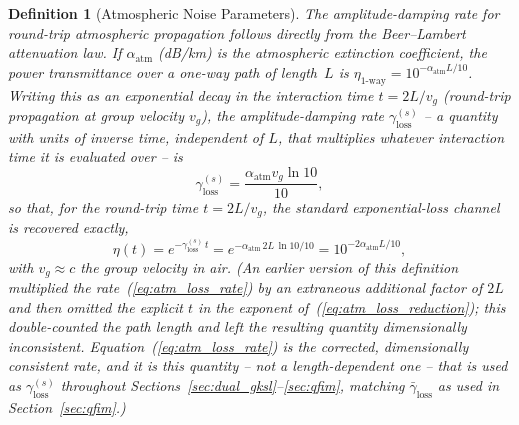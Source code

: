 \documentclass[journal]{IEEEtran}
\newtheorem{definition}{Definition}
\begin{document}
\begin{definition}[Atmospheric Noise Parameters]\label{def:atm_noise}
The amplitude-damping rate for round-trip atmospheric propagation follows directly from the Beer--Lambert attenuation law. If $\alpha_{\text{atm}}$ (dB/km) is the atmospheric extinction coefficient, the power transmittance over a one-way path of length~$L$ is $\eta_{\text{1-way}} = 10^{-\alpha_{\text{atm}}L/10}$. Writing this as an exponential decay in the interaction time $t=2L/v_g$ (round-trip propagation at group velocity $v_g$), the amplitude-damping \emph{rate} $\gamma_{\text{loss}}^{(s)}$ -- a quantity with units of inverse time, independent of $L$, that multiplies whatever interaction time it is evaluated over -- is
\begin{equation}\label{eq:atm_loss_rate}
\gamma_{\text{loss}}^{(s)} = \frac{\alpha_{\text{atm}} v_g \ln 10}{10},
\end{equation}
so that, for the round-trip time $t = 2L/v_g$, the standard exponential-loss channel is recovered exactly,
\begin{equation}\label{eq:atm_loss_reduction}
\eta(t) = e^{-\gamma_{\text{loss}}^{(s)}\,t} = e^{-\alpha_{\text{atm}}\,2L\,\ln 10/10} = 10^{-2\alpha_{\text{atm}}L/10},
\end{equation}
with $v_g \approx c$ the group velocity in air. (An earlier version of this definition multiplied the rate~(\ref{eq:atm_loss_rate}) by an extraneous additional factor of $2L$ and then omitted the explicit $t$ in the exponent of~(\ref{eq:atm_loss_reduction}); this double-counted the path length and left the resulting quantity dimensionally inconsistent. Equation~(\ref{eq:atm_loss_rate}) is the corrected, dimensionally consistent rate, and it is this quantity -- not a length-dependent one -- that is used as $\gamma_{\text{loss}}^{(s)}$ throughout Sections~\ref{sec:dual_gksl}--\ref{sec:qfim}, matching $\bar\gamma_{\text{loss}}$ as used in Section~\ref{sec:qfim}.)


\end{definition}
\end{document}
